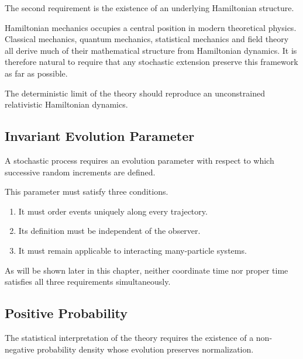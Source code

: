 The second requirement is the existence of an underlying Hamiltonian
structure.

Hamiltonian mechanics occupies a central position in modern theoretical
physics. Classical mechanics, quantum mechanics, statistical mechanics
and field theory all derive much of their mathematical structure from
Hamiltonian dynamics. It is therefore natural to require that any
stochastic extension preserve this framework as far as possible.

The deterministic limit of the theory should reproduce an unconstrained
relativistic Hamiltonian dynamics.

\subsection{Invariant Evolution Parameter}

A stochastic process requires an evolution parameter with respect to
which successive random increments are defined.

This parameter must satisfy three conditions.

\begin{enumerate}

\item
It must order events uniquely along every trajectory.

\item
Its definition must be independent of the observer.

\item
It must remain applicable to interacting many-particle systems.

\end{enumerate}

As will be shown later in this chapter, neither coordinate time nor
proper time satisfies all three requirements simultaneously.

\subsection{Positive Probability}

The statistical interpretation of the theory requires the existence of a
non-negative probability density whose evolution preserves
normalization.

